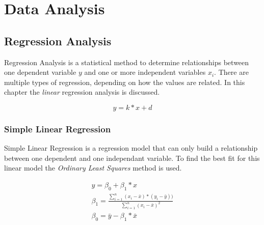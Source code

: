 \chapter{Data Analysis}
\label{ch:dataanalysis}










\section {Regression Analysis}

Regression Analysis is a statistical method to determine relationships between one dependent variable $ y $ and one or more independent variables $ x_i $. There are multiple types of regression, depending on how the values are related. In this chapter the \textit{linear} regression analysis is discussed.

\begin{equation}
    y = k*x + d
\end{equation}

\subsection{Simple Linear Regression}

Simple Linear Regression is a regression model that can only build a relationship between one dependent and one independant variable. To find the best fit for this linear model the \textit{Ordinary Least Squares} method is used.

\begin{gather}
    y = \beta_0 + \beta_1*x \\
    \beta_1 = \frac{\sum_{i=1}^{n} (x_i - \bar{x}) * (y_i - \bar{y}))}{\sum_{i=1}^{n} (x_i - \bar{x})^2} \\
    \beta_0 = \bar{y} - \beta_1 * \bar{x}
\end{gather}


